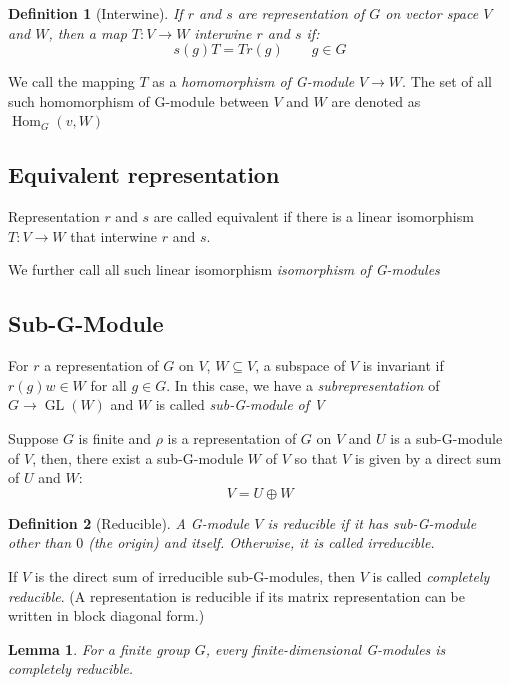 \documentclass{amsart}
\newtheorem{definition}{Definition}
\newtheorem{lemma}{Lemma}
\DeclareMathOperator{\GL}{GL}
\DeclareMathOperator{\Hom}{Hom}
\begin{document}
\vspace{10pt}

\begin{definition}
    [Interwine]
    If $r$ and $s$ are representation of $G$ on vector space $V$ and $W$, then a map
    $T\colon V\to W$ interwine $r$ and $s$ if:
    \[s(g)T = Tr(g) \qquad g\in G\]
\end{definition}
We call the mapping $T$ as a \emph{homomorphism of G-module} $V\to W$. The set of all such homomorphism of G-module 
between $V$ and $W$ are denoted as $\Hom_G(v,W)$

\subsection*{Equivalent representation}
Representation $r$ and $s$ are called equivalent if there is a linear isomorphism $T\colon V\to W$ that 
interwine $r$ and $s$.

We further call all such linear isomorphism \emph{isomorphism of G-modules} 

\vspace{10pt}

\subsection*{Sub-G-Module}
For $r$ a representation of $G$ on $V$, $W\subseteq V$, a subspace of $V$ is invariant if 
$r(g)w \in W$ for all $g\in G$. 
In this case, we have a \emph{subrepresentation} of $G\to \GL(W)$ and $W$ is called 
\emph{sub-G-module of V}

Suppose $G$ is finite and $\rho$ is a representation of $G$ on $V$ and $U$ is a sub-G-module of $V$,
then, there exist a sub-G-module $W$ of $V$ so that $V$ is given by a direct sum of $U$ and $W$:
\[V = U \oplus W\]

\begin{definition}
    [Reducible]
    A G-module $V$ is reducible if it has sub-G-module other than $0$ (the origin) and itself. 
    Otherwise, it is called \emph{irreducible}.
\end{definition}
If $V$ is the direct sum of irreducible sub-G-modules, then $V$ is called \emph{completely reducible}.
(A representation is reducible if its matrix representation can be written in block diagonal form.)

\begin{lemma}
    For a finite group $G$, every finite-dimensional G-modules is completely reducible.
\end{lemma}
\end{document}
